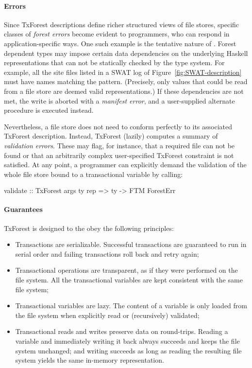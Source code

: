 \paragraph{Errors}
Since TxForest descriptions define richer structured views of file stores, specific classes of \emph{forest errors} become evident to programmers, who can respond in application-specific ways.
One such example is the tentative nature of . Forest dependent types may impose certain data dependencies on the underlying Haskell representations that can not be statically checked by the type system. For example, all the site files listed in a SWAT log of Figure~\ref{fig:SWAT-description} must have names matching the  pattern. (Precisely, only values that could be read from a file store are deemed valid representations.) If these dependencies are not met, the write is aborted with a \emph{manifest error}, and a user-supplied alternate procedure is executed instead.

Nevertheless, a file store does not need to conform perfectly to its associated TxForest description.
Instead, TxForest (lazily) computes a summary of \emph{validation errors}. These may flag, for instance, that a required file can not be found or that an arbitrarily complex user-specified TxForest constraint is not satisfied.
At any point, a programmer can explicitly demand the validation of the whole file store bound to a transactional variable by calling:
\begin{code}
validate :: TxForest args ty rep => ty -> FTM ForestErr
\end{code}


\paragraph{Guarantees}
TxForest is designed to the obey the following principles:
\begin{itemize} 
	\item Transactions are serializable. Successful transactions are guaranteed to run in serial order and failing transactions roll back and retry again;
	\item Transactional operations are transparent, as if they were performed on the file system. All the transactional variables are kept consistent with the same file system;
	\item Transactional variables are lazy. The content of a variable is only loaded from the file system when explicitly read or (recursively) validated;
	\item Transactional reads and writes preserve data on round-trips. Reading a variable and immediately writing it back always succeeds and keeps the file system unchanged; and writing succeeds as long as reading the resulting file system yields the same in-memory representation.
\end{itemize}




